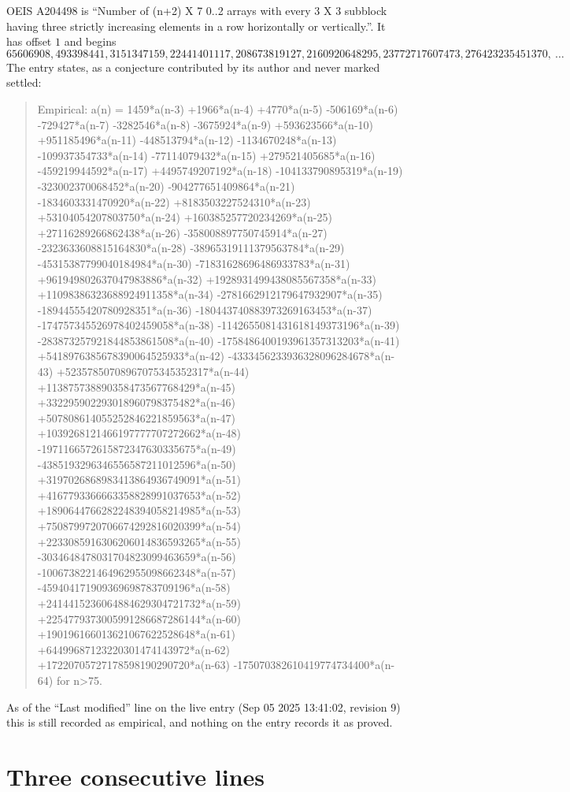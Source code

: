 \documentclass[11pt,a4paper]{article}
\theoremstyle{plain}
\theoremstyle{definition}
\begin{document}
OEIS A204498 is ``Number of (n+2) X 7 0..2 arrays with every 3 X 3 subblock having three strictly increasing elements in a row horizontally or vertically.''. It has offset $1$ and begins
\[
65606908, 493398441, 3151347159, 22441401117, 208673819127, 2160920648295, 23772717607473, 276423235451370,\ \dots
\]
The entry states, as a conjecture contributed by its author and never marked settled:
\begin{quote}
Empirical: a(n) = 1459*a(n-3) +1966*a(n-4) +4770*a(n-5) -506169*a(n-6) -729427*a(n-7) -3282546*a(n-8) -3675924*a(n-9) +593623566*a(n-10) +951185496*a(n-11) -448513794*a(n-12) -1134670248*a(n-13) -109937354733*a(n-14) -77114079432*a(n-15) +279521405685*a(n-16) -459219944592*a(n-17) +4495749207192*a(n-18) -104133790895319*a(n-19) -323002370068452*a(n-20) -904277651409864*a(n-21) -1834603331470920*a(n-22) +8183503227524310*a(n-23) +53104054207803750*a(n-24) +160385257720234269*a(n-25) +27116289266862438*a(n-26) -358008897750745914*a(n-27) -2323633608815164830*a(n-28) -38965319111379563784*a(n-29) -45315387799040184984*a(n-30) -71831628696486933783*a(n-31) +961949802637047983886*a(n-32) +1928931499438085567358*a(n-33) +11098386323688924911358*a(n-34) -2781662912179647932907*a(n-35) -18944555420780928351*a(n-36) -180443740883973269163453*a(n-37) -174757345526978402459058*a(n-38) -1142655081431618149373196*a(n-39) -283873257921844853861508*a(n-40) -1758486400193961357313203*a(n-41) +5418976385678390064525933*a(n-42) -4333456233936328096284678*a(n-43) +52357850708967075345352317*a(n-44) +113875738890358473567768429*a(n-45) +332295902293018960798375482*a(n-46) +507808614055252846221859563*a(n-47) +1039268121466197777707272662*a(n-48) -1971166572615872347630335675*a(n-49) -4385193296346556587211012596*a(n-50) +3197026868983413864936749091*a(n-51) +4167793366663358828991037653*a(n-52) +1890644766282248394058214985*a(n-53) +7508799720706674292816020399*a(n-54) +2233085916306206014836593265*a(n-55) -3034648478031704823099463659*a(n-56) -1006738221464962955098662348*a(n-57) -459404171909369698783709196*a(n-58) +2414415236064884629304721732*a(n-59) +2254779373005991286687286144*a(n-60) +190196166013621067622528648*a(n-61) +64499687123220301474143972*a(n-62) +17220705727178598190290720*a(n-63) -175070382610419774734400*a(n-64) for n>75.
\end{quote}
As of the ``Last modified'' line on the live entry (Sep 05 2025 13:41:02, revision 9) this is still
recorded as empirical, and nothing on the entry records it as proved.

\section{Three consecutive lines}
\end{document}
